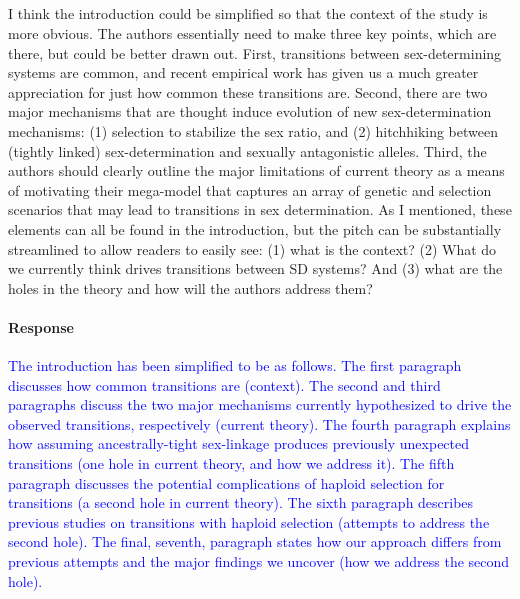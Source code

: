 \documentclass[10pt,letterpaper]{article}
\begin{document}
\noindent\subsection{}
I think the introduction could be simplified so that the context of the study is more obvious. The authors essentially need to make three key points, which are there, but could be better drawn out. First, transitions between sex-determining systems are common, and recent empirical work has given us a much greater appreciation for just how common these transitions are. Second, there are two major mechanisms that are thought induce evolution of new sex-determination mechanisms: (1) selection to stabilize the sex ratio, and (2) hitchhiking between (tightly linked) sex-determination and sexually antagonistic alleles. Third, the authors should clearly outline the major limitations of current theory as a means of motivating their mega-model that captures an array of genetic and selection scenarios that may lead to transitions in sex determination. As I mentioned, these elements can all be found in the introduction, but the pitch can be substantially streamlined to allow readers to easily see: (1) what is the context? (2) What do we currently think drives transitions between SD systems? And (3) what are the holes in the theory and how will the authors address them?

\noindent\paragraph{Response}
\textcolor{blue}{
The introduction has been simplified to be as follows.
The first paragraph discusses how common transitions are (context). 
The second and third paragraphs discuss the two major mechanisms currently hypothesized to drive the observed transitions, respectively (current theory). 
The fourth paragraph explains how assuming ancestrally-tight sex-linkage produces previously unexpected transitions (one hole in current theory, and how we address it).
The fifth paragraph discusses the potential complications of haploid selection for transitions (a second hole in current theory).
The sixth paragraph describes previous studies on transitions with haploid selection (attempts to address the second hole). 
The final, seventh, paragraph states how our approach differs from previous attempts and the major findings we uncover (how we address the second hole).  
}
\end{document}
